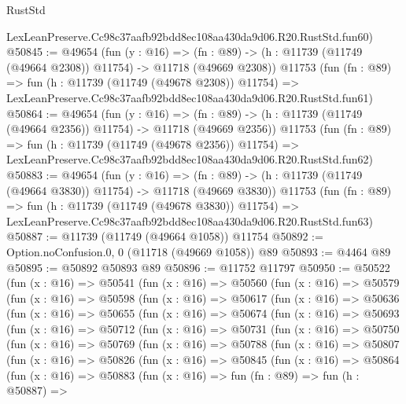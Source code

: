 \begin{lexlean}{RustStd}
\begin{coremodule}
    LexLeanPreserve.Cc98c37aafb92bdd8ec108aa430da9d06.R20.RustStd.fun60)
@50845 := @49654
    (fun (y : @16) =>
    (fn : @89) -> (h : @11739 (@11749 (@49664 @2308)) @11754) -> @11718 (@49669 @2308))
    @11753
    (fun (fn : @89) =>
    fun (h : @11739 (@11749 (@49678 @2308)) @11754) =>
    LexLeanPreserve.Cc98c37aafb92bdd8ec108aa430da9d06.R20.RustStd.fun61)
@50864 := @49654
    (fun (y : @16) =>
    (fn : @89) -> (h : @11739 (@11749 (@49664 @2356)) @11754) -> @11718 (@49669 @2356))
    @11753
    (fun (fn : @89) =>
    fun (h : @11739 (@11749 (@49678 @2356)) @11754) =>
    LexLeanPreserve.Cc98c37aafb92bdd8ec108aa430da9d06.R20.RustStd.fun62)
@50883 := @49654
    (fun (y : @16) =>
    (fn : @89) -> (h : @11739 (@11749 (@49664 @3830)) @11754) -> @11718 (@49669 @3830))
    @11753
    (fun (fn : @89) =>
    fun (h : @11739 (@11749 (@49678 @3830)) @11754) =>
    LexLeanPreserve.Cc98c37aafb92bdd8ec108aa430da9d06.R20.RustStd.fun63)
@50887 := @11739 (@11749 (@49664 @1058)) @11754
@50892 := Option.noConfusion.{0, 0} (@11718 (@49669 @1058)) @89
@50893 := @4464 @89
@50895 := @50892 @50893 @89
@50896 := @11752 @11797
@50950 := @50522
    (fun (x : @16) =>
    @50541
      (fun (x : @16) =>
      @50560
        (fun (x : @16) =>
        @50579
          (fun (x : @16) =>
          @50598
            (fun (x : @16) =>
            @50617
              (fun (x : @16) =>
              @50636
                (fun (x : @16) =>
                @50655
                  (fun (x : @16) =>
                  @50674
                    (fun (x : @16) =>
                    @50693
                      (fun (x : @16) =>
                      @50712
                        (fun (x : @16) =>
                        @50731
                          (fun (x : @16) =>
                          @50750
                            (fun (x : @16) =>
                            @50769
                              (fun (x : @16) =>
                              @50788
                                (fun (x : @16) =>
                                @50807
                                  (fun (x : @16) =>
                                  @50826
                                    (fun (x : @16) =>
                                    @50845
                                      (fun (x : @16) =>
                                      @50864
                                        (fun (x : @16) =>
                                        @50883
                                          (fun (x : @16) =>
                                          fun (fn : @89) =>
                                          fun (h : @50887) =>

\end{coremodule}
\end{lexlean}
